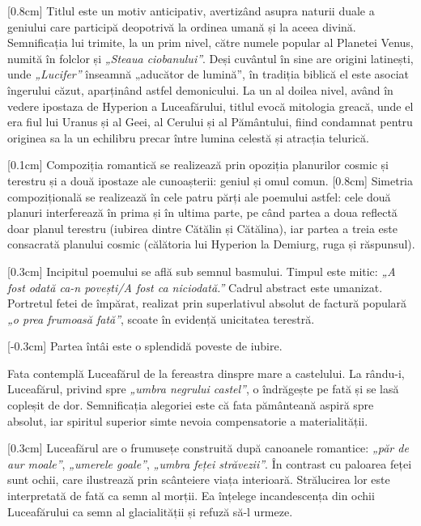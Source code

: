 [0.8cm]
Titlul este un motiv anticipativ, avertizând asupra naturii duale a geniului care participă deopotrivă la ordinea umană și la aceea divină. Semnificația lui trimite, la un prim nivel, către numele popular al Planetei Venus, numită în folclor și \textit{„Steaua ciobanului”}. Deși cuvântul în sine are origini latinești, unde \textit{„Lucifer”} înseamnă „aducător de lumină”, în tradiția biblică el este asociat îngerului căzut, aparținând astfel demonicului. La un al doilea nivel, având în vedere ipostaza de Hyperion a Luceafărului, titlul evocă mitologia greacă, unde el era fiul lui Uranus și al Geei, al Cerului și al Pământului, fiind condamnat pentru originea sa la un echilibru precar între lumina celestă și atracția telurică.

[0.1cm]
Compoziția romantică se realizează prin opoziția planurilor cosmic și terestru și a două ipostaze ale cunoașterii: geniul și omul comun.
[0.8cm]
Simetria compozițională se realizează în cele patru părți ale poemului astfel: cele două planuri interferează în prima și în ultima parte, pe când partea a doua reflectă doar planul terestru (iubirea dintre Cătălin și Cătălina), iar partea a treia este consacrată planului cosmic (călătoria lui Hyperion la Demiurg, ruga și răspunsul).

[0.3cm]
Incipitul poemului se află sub semnul basmului. Timpul este mitic: \textit{„A fost odată ca-n povești/A fost ca niciodată.”} Cadrul abstract este umanizat. Portretul fetei de împărat, realizat prin superlativul absolut de factură populară \textit{„o prea frumoasă fată”}, scoate în evidență unicitatea terestră.

[-0.3cm]
Partea întâi este o splendidă poveste de iubire.

Fata contemplă Luceafărul de la fereastra dinspre mare a castelului. La rându-i, Luceafărul, privind spre \textit{„umbra negrului castel”}, o îndrăgește pe fată și se lasă copleșit de dor. Semnificația alegoriei este că fata pământeană aspiră spre absolut, iar spiritul superior simte nevoia compensatorie a materialității.

[0.3cm]
Luceafărul are o frumusețe construită după canoanele romantice: \textit{„păr de aur moale”}, \textit{„umerele goale”}, \textit{„umbra feței străvezii”}. În contrast cu paloarea feței sunt ochii, care ilustrează prin scânteiere viața interioară. Strălucirea lor este interpretată de fată ca semn al morții. Ea înțelege incandescența din ochii Luceafărului ca semn al glacialității și refuză să-l urmeze.

